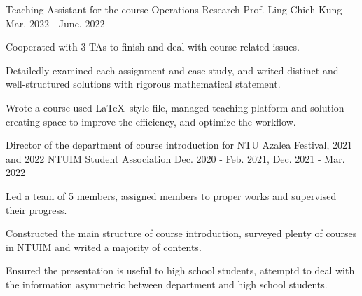 

\begin{cventries}

  \cventry
    {Teaching Assistant for the course Operations Research} %
    {Prof. Ling-Chieh Kung} %
    {} %
    {Mar. 2022 - June. 2022} %
    {
      \begin{cvitems} %
        \item {Cooperated with 3 TAs to finish and deal with
                course-related issues.}
        \item {Detailedly examined each assignment and case study,
            and writed distinct and well-structured solutions
        with rigorous mathematical statement.} 
        \item {Wrote a course-used \LaTeX\ style file, managed
            teaching platform and solution-creating space to 
        improve the efficiency, and optimize the workflow.}
      \end{cvitems}
    }



  \cventry
    {Director of the department of course introduction for NTU Azalea Festival, 2021 and 2022} %
    {NTUIM Student Association} %
    {} %
    {Dec. 2020 - Feb. 2021, Dec. 2021 - Mar. 2022} %
    {
      \begin{cvitems} %
        \item {Led a team of 5 members, assigned members to proper works and
            supervised their progress.}
        \item {Constructed the main structure of course introduction,
            surveyed plenty of courses in NTUIM and writed a majority of contents.}
        \item {Ensured the presentation is useful to high school students, 
            attemptd to deal with the information asymmetric between department 
            and high school students.}
      \end{cvitems}
    }

\end{cventries}
